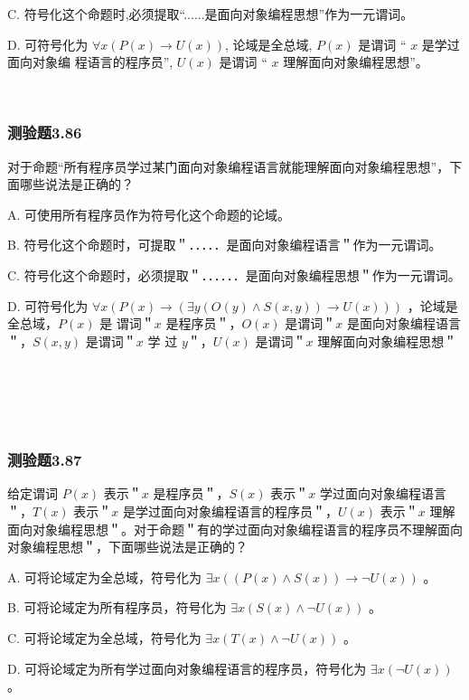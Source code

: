 \documentclass[UTF8, heading=true]{ctexart}
\begin{document}
C. 符号化这个命题时,必须提取“......是面向对象编程思想”作为一元谓词。

D. 可符号化为 $\forall x(P(x) \rightarrow U(x))$, 论域是全总域, $P(x)$ 是谓词 “ $x$ 是学过面向对象编
程语言的程序员”, $U(x)$ 是谓词 “ $x$ 理解面向对象编程思想”。

\textcolor{white}{答案：AD}

\subsubsection{测验题3.86}

对于命题“所有程序员学过某门面向对象编程语言就能理解面向对象编程思想”，下面哪些说法是正确的？

A. 
可使用所有程序员作为符号化这个命题的论域。

B. 
符号化这个命题时，可提取＂．．．．．是面向对象编程语言＂作为一元谓词。

C. 
符号化这个命题时，必须提取＂．．．．．．是面向对象编程思想＂作为一元谓词。

D. 
可符号化为 $\forall x(P(x) \rightarrow(\exists y(O(y) \wedge S(x, y)) \rightarrow U(x)))$ ，论域是全总域，$P(x)$ 是
谓词＂$x$ 是程序员＂，$O(x)$ 是谓词＂$x$ 是面向对象编程语言＂，$S(x, y)$ 是谓词＂$x$ 学
过 $y$＂，$U(x)$ 是谓词＂$x$ 理解面向对象编程思想＂

\textcolor{white}{答案：BD}

\textcolor{white}{解析：A选项为面向对象被量词“某门”修饰，是个体类，整个命题涉及多个个体类，所以需要使用更大的集合作为论域。}

\subsubsection{测验题3.87}

给定谓词 $P(x)$ 表示＂$x$ 是程序员＂，$S(x)$ 表示＂$x$ 学过面向对象编程语言＂，$T(x)$ 表示＂$x$ 是学过面向对象编程语言的程序员＂，$U(x)$ 表示＂$x$ 理解面向对象编程思想＂。对于命题＂有的学过面向对象编程语言的程序员不理解面向对象编程思想＂，下面哪些说法是正确的？

A. 可将论域定为全总域，符号化为 $\exists x((P(x) \wedge S(x)) \rightarrow \neg U(x))$ 。

B. 可将论域定为所有程序员，符号化为 $\exists x(S(x) \wedge \neg U(x))$ 。

C. 可将论域定为全总域，符号化为 $\exists x(T(x) \wedge \neg U(x))$ 。

D.  可将论域定为所有学过面向对象编程语言的程序员，符号化为 $\exists x(\neg U(x))$ 。
\end{document}
